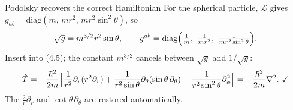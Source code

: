 \documentclass[aspectratio=169,10pt]{beamer}
\newcommand{\stagenum}{0}
\newcommand{\setstage}[1]{\renewcommand{\stagenum}{#1}}
\begin{document}
\begin{frame}{Podolsky recovers the correct Hamiltonian}
\setstage{3}
For the spherical particle, $\mathcal L$ gives $g_{ab}=\mathrm{diag}(m,\,mr^2,\,mr^2\sin^2\theta)$, so
\begin{equation*}
\sqrt g=m^{3/2}r^2\sin\theta,\qquad g^{ab}=\mathrm{diag}\Bigl(\tfrac1m,\ \tfrac1{mr^2},\ \tfrac1{mr^2\sin^2\theta}\Bigr).
\end{equation*}
Insert into (4.5); the constant $m^{3/2}$ cancels between $\sqrt g$ and $1/\sqrt g$:
\begin{equation*}
\hat T=-\frac{\hbar^2}{2m}\Bigl[\frac{1}{r^2}\partial_r(r^2\partial_r)+\frac{1}{r^2\sin\theta}\partial_\theta(\sin\theta\,\partial_\theta)+\frac{1}{r^2\sin^2\theta}\partial_\phi^2\Bigr]=-\frac{\hbar^2}{2m}\nabla^2. \ \checkmark
\end{equation*}
The $\tfrac2r\partial_r$ and $\cot\theta\,\partial_\theta$ are \alert{restored automatically}.
\end{frame}
\end{document}
